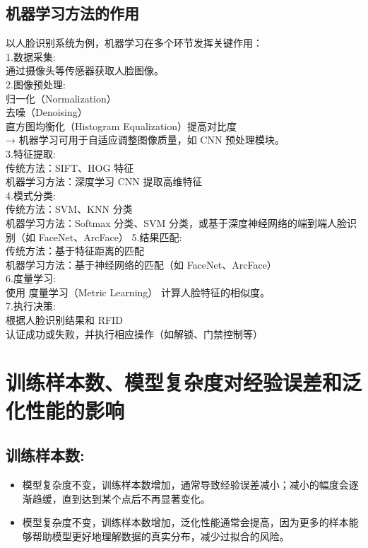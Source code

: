 \documentclass{article}
\begin{document}
\subsection{机器学习方法的作用}
以人脸识别系统为例，机器学习在多个环节发挥关键作用：\\
1.数据采集:\\
\indent 通过摄像头等传感器获取人脸图像。\\
2.图像预处理:\\
\indent 归一化（Normalization）\\
\indent 去噪（Denoising）\\
\indent 直方图均衡化（Histogram Equalization）提高对比度\\
\indent → 机器学习可用于自适应调整图像质量，如 CNN 预处理模块。\\
3.特征提取:\\
\indent 传统方法：SIFT、HOG 特征\\
\indent 机器学习方法：深度学习 CNN 提取高维特征\\
4.模式分类:\\
\indent 传统方法：SVM、KNN 分类\\
\indent 机器学习方法：Softmax 分类、SVM 分类，或基于深度神经网络的端到端人脸识别（如 FaceNet、ArcFace）
5.结果匹配:\\
\indent 传统方法：基于特征距离的匹配\\  
\indent 机器学习方法：基于神经网络的匹配（如 FaceNet、ArcFace）\\
6.度量学习:\\
\indent 使用 度量学习（Metric Learning） 计算人脸特征的相似度。\\
7.执行决策:\\
\indent 根据人脸识别结果和 RFID\\
\indent 认证成功或失败，并执行相应操作（如解锁、门禁控制等）\\

\section{训练样本数、模型复杂度对经验误差和泛化性能的影响}
\subsection{训练样本数:}
\begin{itemize}
    \item 模型复杂度不变，训练样本数增加，通常导致经验误差减小；减小的幅度会逐渐趋缓，直到达到某个点后不再显著变化。
    \item 模型复杂度不变，训练样本数增加，泛化性能通常会提高，因为更多的样本能够帮助模型更好地理解数据的真实分布，减少过拟合的风险。
\end{itemize}
\end{document}
